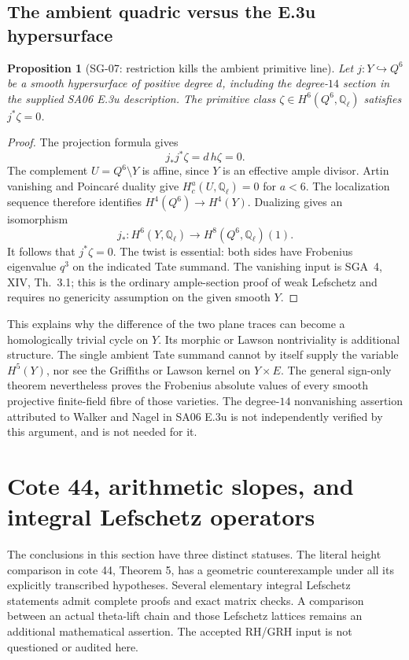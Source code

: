 \documentclass[11pt,a4paper]{article}
\newtheorem{proposition}[theorem]{Proposition}
\theoremstyle{remark}
\begin{document}
\subsection{The ambient quadric versus the E.3u hypersurface}

\begin{proposition}[SG-07: restriction kills the ambient primitive line]
Let $j:Y\hookrightarrow Q^6$ be a smooth hypersurface of positive degree $d$, including the degree-$14$ section in the supplied SA06 E.3u description. The primitive class $\zeta\in H^6(Q^6,\mathbb Q_\ell)$ satisfies $j^*\zeta=0$.
\end{proposition}

\begin{proof}
The projection formula gives
\[
 j_*j^*\zeta=d\,h\zeta=0.
\]
The complement $U=Q^6\setminus Y$ is affine, since $Y$ is an effective ample divisor. Artin vanishing and Poincar\'e duality give $H_c^a(U,\mathbb Q_\ell)=0$ for $a<6$. The localization sequence therefore identifies $H^4(Q^6)\to H^4(Y)$. Dualizing gives an isomorphism
\[
 j_*:H^6(Y,\mathbb Q_\ell)
 \longrightarrow H^8(Q^6,\mathbb Q_\ell)(1).
\]
It follows that $j^*\zeta=0$. The twist is essential: both sides have Frobenius eigenvalue $q^3$ on the indicated Tate summand. The vanishing input is SGA~4, XIV, Th.~3.1; this is the ordinary ample-section proof of weak Lefschetz and requires no genericity assumption on the given smooth $Y$.
\end{proof}

This explains why the difference of the two plane traces can become a homologically trivial cycle on $Y$. Its morphic or Lawson nontriviality is additional structure. The single ambient Tate summand cannot by itself supply the variable $H^5(Y)$, nor see the Griffiths or Lawson kernel on $Y\times E$. The general sign-only theorem nevertheless proves the Frobenius absolute values of every smooth projective finite-field fibre of those varieties. The degree-$14$ nonvanishing assertion attributed to Walker and Nagel in SA06 E.3u is not independently verified by this argument, and is not needed for it.


\section{Cote 44, arithmetic slopes, and integral Lefschetz operators}
\label{sec:arithmetic-sl2}

The conclusions in this section have three distinct statuses.  The literal
height comparison in cote 44, Theorem 5, has a geometric counterexample under
all its explicitly transcribed hypotheses.  Several elementary integral
Lefschetz statements admit complete proofs and exact matrix checks.  A
comparison between an actual theta-lift chain and those Lefschetz lattices
remains an additional mathematical assertion.  The accepted RH/GRH input is
not questioned or audited here.
\end{document}
